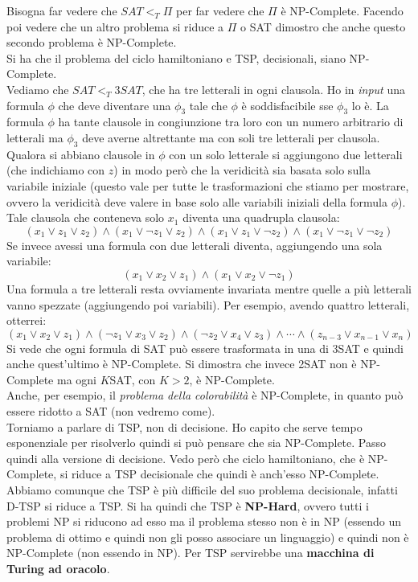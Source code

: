 Bisogna far vedere che $SAT<_T \Pi$ per far vedere che $\Pi$ è
NP-Complete. Facendo poi vedere che un altro problema si riduce a $\Pi$ o SAT
dimostro che anche questo secondo problema è NP-Complete. \\
Si ha che il problema del ciclo hamiltoniano e TSP, decisionali, siano
NP-Complete.\\
Vediamo che $SAT<_T 3SAT$, che ha tre letterali in ogni clausola. Ho in \textit{input}
una formula $\phi$ che deve diventare una $\phi_3$ tale che $\phi$ è
soddisfacibile sse $\phi_3$ lo è. La formula $\phi$ ha tante clausole in
congiunzione tra loro con un numero arbitrario di letterali ma $\phi_3$ deve
averne altrettante ma con soli tre letterali per clausola. Qualora si abbiano
clausole in $\phi$ con un solo letterale si aggiungono due letterali (che
indichiamo con $z$) in modo
però che la veridicità sia basata solo sulla variabile iniziale (questo vale per
tutte le trasformazioni che stiamo per mostrare, ovvero la veridicità deve
valere in base solo alle variabili iniziali della formula $\phi$). Tale clausola
che conteneva solo $x_1$ diventa una quadrupla clausola:
\[(x_1\lor z_1\lor z_2)\land (x_1\lor\neg z_1\lor z_2)\land (x_1\lor z_1\lor\neg
  z_2)\land(x_1\lor\neg z_1\lor\neg z_2)\] 
Se invece avessi una formula con due letterali diventa, aggiungendo una sola
variabile: 
\[(x_1\lor x_2\lor z_1)\land (x_1\lor x_2\lor \neg z_1)\]
Una formula a tre letterali resta ovviamente invariata mentre quelle a più
letterali vanno spezzate (aggiungendo poi variabili). Per esempio, avendo
quattro letterali, otterrei:
\[(x_1\lor x_2\lor z_1)\land (\neg z_1\lor x_3\lor z_2)\land (\neg z_2\lor
  x_4\lor z_3)\land\cdots\land(z_{n-3}\lor x_{n-1}\lor x_n)\]
Si vede che ogni formula di SAT può essere trasformata in una di 3SAT e quindi
anche quest'ultimo è NP-Complete. Si dimostra che invece 2SAT non è NP-Complete
ma ogni $K$SAT, con $K>2$, è NP-Complete.\\
Anche, per esempio, il \textit{problema della colorabilità} è NP-Complete, in
quanto può essere ridotto a SAT (non vedremo come).\\
Torniamo a parlare di TSP, non di decisione. Ho capito che serve tempo
esponenziale per risolverlo quindi si può pensare che sia NP-Complete. Passo
quindi alla versione di decisione. Vedo però che ciclo
hamiltoniano, che è NP-Complete, si riduce a TSP decisionale che quindi è
anch'esso NP-Complete. Abbiamo comunque che TSP è più difficile del suo problema
decisionale, infatti D-TSP si riduce a TSP. Si ha quindi che TSP è
\textbf{NP-Hard}, ovvero tutti i problemi NP si riducono ad esso ma il problema
stesso non è in NP (essendo un problema di ottimo e quindi non gli posso
associare un linguaggio) e quindi non è NP-Complete (non essendo in NP). Per
TSP servirebbe una \textbf{macchina di Turing ad oracolo}.
